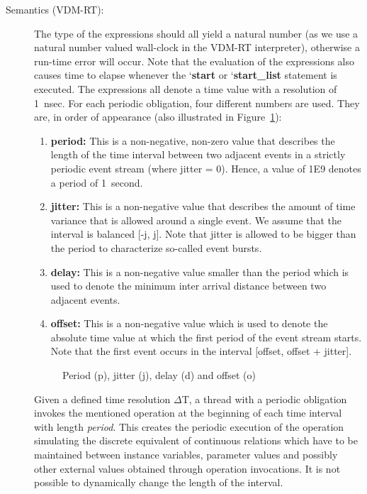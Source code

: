 \documentclass{overturerepchap}
\newcommand{\Lop}[1]{`{\bf\ttfamily #1}\Quote}
\begin{document}
{\begin{description}
\item[Semantics (VDM-RT):] The type of the expressions should all yield a natural number (as we use a natural number valued wall-clock in the VDM-RT interpreter), otherwise a run-time error will occur. Note that the evaluation of the expressions also causes time to elapse whenever the \Lop{start} or \Lop{start\_list} statement is executed. The expressions all denote a time value with a resolution of 1~nsec.
For each periodic obligation, four different numbers are used. They are, in order
of appearance (also illustrated in Figure~\ref{fig:PeriodJitterDelayOffset}):

\begin{enumerate}
\item \textbf{period:} This is a non-negative, non-zero value that describes the length of the
time interval between two adjacent events in a strictly periodic event stream (where jitter = 0). Hence, a value of 1E9 denotes a period of 1~second.
\item \textbf{jitter:} This is a non-negative value that describes the amount of time variance that is allowed
around a single event. We assume that the interval is balanced [-j, j]. Note that jitter is
allowed to be bigger than the period to characterize so-called event bursts.
\item \textbf{delay:} This is a non-negative value smaller than the period which is used to denote the minimum
inter arrival distance between two adjacent events.
\item \textbf{offset:} This is a non-negative value which is used to denote the absolute time value at which
the first period of the event stream starts. Note that the first event occurs in the interval
[offset, offset + jitter].
\end{enumerate}

\begin{figure}
\begin{center}
\caption{{Period (p), jitter (j), delay (d) and offset (o)}\label{fig:PeriodJitterDelayOffset}}
\end{center}
\end{figure}

Given a defined time resolution $\Delta$T, a thread with a periodic
obligation invokes the mentioned operation at the beginning of each
time interval with length {\em period}.  This creates the periodic
execution of the operation simulating the discrete equivalent of
continuous relations which have to be maintained between instance
variables, parameter values and possibly other external values
obtained through operation invocations.  It is not possible to dynamically 
change the length of the interval.


\end{description}}
\end{document}
